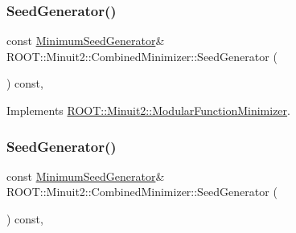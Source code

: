 \mbox{\label{classROOT_1_1Minuit2_1_1CombinedMinimizer_a667ce6c321b6948d37087a2ac06be58c}} 
\subsubsection{\texorpdfstring{SeedGenerator()}{SeedGenerator()}\hspace{0.1cm}{\footnotesize\ttfamily [1/3]}}
{\footnotesize\ttfamily const \mbox{\hyperlink{classROOT_1_1Minuit2_1_1MinimumSeedGenerator}{Minimum\+Seed\+Generator}}\& R\+O\+O\+T\+::\+Minuit2\+::\+Combined\+Minimizer\+::\+Seed\+Generator (\begin{DoxyParamCaption}{ }\end{DoxyParamCaption}) const\hspace{0.3cm}{\ttfamily [inline]}, {\ttfamily [virtual]}}



Implements \mbox{\hyperlink{classROOT_1_1Minuit2_1_1ModularFunctionMinimizer_a742930de97b0ce9ba23773874ae0894b}{R\+O\+O\+T\+::\+Minuit2\+::\+Modular\+Function\+Minimizer}}.

\mbox{\label{classROOT_1_1Minuit2_1_1CombinedMinimizer_a667ce6c321b6948d37087a2ac06be58c}} 
\subsubsection{\texorpdfstring{SeedGenerator()}{SeedGenerator()}\hspace{0.1cm}{\footnotesize\ttfamily [2/3]}}
{\footnotesize\ttfamily const \mbox{\hyperlink{classROOT_1_1Minuit2_1_1MinimumSeedGenerator}{Minimum\+Seed\+Generator}}\& R\+O\+O\+T\+::\+Minuit2\+::\+Combined\+Minimizer\+::\+Seed\+Generator (\begin{DoxyParamCaption}{ }\end{DoxyParamCaption}) const\hspace{0.3cm}{\ttfamily [inline]}, {\ttfamily [virtual]}}



